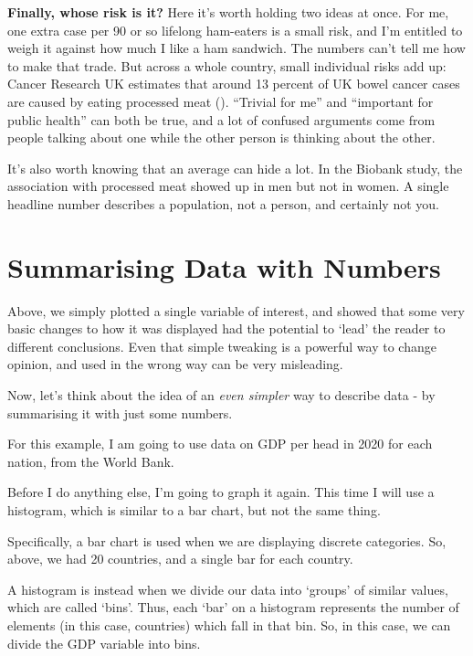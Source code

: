 \documentclass[
]{book}
\begin{document}
\textbf{Finally, whose risk is it?} Here it's worth holding two ideas at once. For me, one extra case per 90 or so lifelong ham-eaters is a small risk, and I'm entitled to weigh it against how much I like a ham sandwich. The numbers can't tell me how to make that trade. But across a whole country, small individual risks add up: Cancer Research UK estimates that around 13 percent of UK bowel cancer cases are caused by eating processed meat (). ``Trivial for me'' and ``important for public health'' can both be true, and a lot of confused arguments come from people talking about one while the other person is thinking about the other.

It's also worth knowing that an average can hide a lot. In the Biobank study, the association with processed meat showed up in men but not in women. A single headline number describes a population, not a person, and certainly not you.

\section{Summarising Data with Numbers}\label{summarizing-data-with-numbers}

Above, we simply plotted a single variable of interest, and showed that some very basic changes to how it was displayed had the potential to `lead' the reader to different conclusions. Even that simple tweaking is a powerful way to change opinion, and used in the wrong way can be very misleading.

Now, let's think about the idea of an \emph{even simpler} way to describe data - by summarising it with just some numbers.

For this example, I am going to use data on GDP per head in 2020 for each nation, from the World Bank.

Before I do anything else, I'm going to graph it again. This time I will use a histogram, which is similar to a bar chart, but not the same thing.

Specifically, a bar chart is used when we are displaying discrete categories. So, above, we had 20 countries, and a single bar for each country.

A histogram is instead when we divide our data into `groups' of similar values, which are called `bins'. Thus, each `bar' on a histogram represents the number of elements (in this case, countries) which fall in that bin. So, in this case, we can divide the GDP variable into bins.
\end{document}
